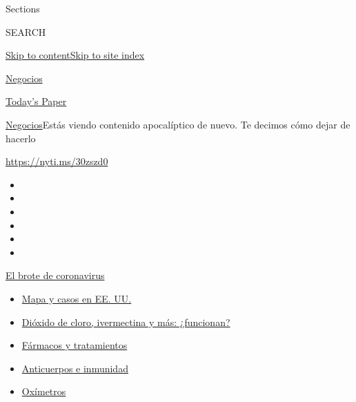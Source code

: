Sections

SEARCH

\protect\hyperlink{site-content}{Skip to
content}\protect\hyperlink{site-index}{Skip to site index}

\href{https://www.nytimes3xbfgragh.onion/es/section/negocios}{Negocios}

\href{https://myaccount.nytimes3xbfgragh.onion/auth/login?response_type=cookie\&client_id=vi}{}

\href{https://www.nytimes3xbfgragh.onion/section/todayspaper}{Today's
Paper}

\href{/es/section/negocios}{Negocios}\textbar{}Estás viendo contenido
apocalíptico de nuevo. Te decimos cómo dejar de hacerlo

\href{https://nyti.ms/30zszd0}{https://nyti.ms/30zszd0}

\begin{itemize}
\item
\item
\item
\item
\item
\item
\end{itemize}

\href{https://www.nytimes3xbfgragh.onion/es/spotlight/coronavirus?action=click\&pgtype=Article\&state=default\&region=TOP_BANNER\&context=storylines_menu}{El
brote de coronavirus}

\begin{itemize}
\tightlist
\item
  \href{https://www.nytimes3xbfgragh.onion/es/interactive/2020/espanol/mundo/coronavirus-en-estados-unidos.html?action=click\&pgtype=Article\&state=default\&region=TOP_BANNER\&context=storylines_menu}{Mapa
  y casos en EE. UU.}
\item
  \href{https://www.nytimes3xbfgragh.onion/es/2020/07/23/espanol/america-latina/bolivia-cloro-coronavirus-ivermectina.html?action=click\&pgtype=Article\&state=default\&region=TOP_BANNER\&context=storylines_menu}{Dióxido
  de cloro, ivermectina y más: ¿funcionan?}
\item
  \href{https://www.nytimes3xbfgragh.onion/es/interactive/2020/science/coronavirus-tratamientos-curas.html?action=click\&pgtype=Article\&state=default\&region=TOP_BANNER\&context=storylines_menu}{Fármacos
  y tratamientos}
\item
  \href{https://www.nytimes3xbfgragh.onion/es/2020/07/28/espanol/ciencia-y-tecnologia/anticuerpos-coronavirus-inmunidad.html?action=click\&pgtype=Article\&state=default\&region=TOP_BANNER\&context=storylines_menu}{Anticuerpos
  e inmunidad}
\item
  \href{https://www.nytimes3xbfgragh.onion/es/2020/04/29/espanol/estilos-de-vida/oximetro-para-que-sirve.html?action=click\&pgtype=Article\&state=default\&region=TOP_BANNER\&context=storylines_menu}{Oxímetros}
\end{itemize}

